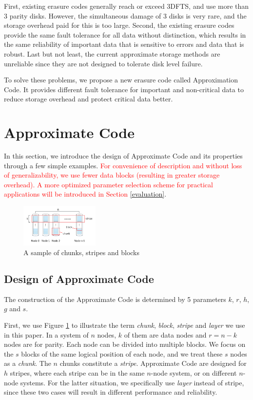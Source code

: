 \documentclass[sigconf]{acmart}
\begin{document}
First, existing erasure codes generally reach or exceed 3DFTS, and use more than 3 parity disks. However, the simultaneous damage of 3 disks is very rare, and the storage overhead paid for this is too large. Second, the existing erasure codes provide the same fault tolerance for all data without distinction, which results in the same reliability of important data that is sensitive to errors and data that is robust. Last but not least, the current approximate storage methods are unreliable since they are not designed to tolerate disk level failure.

To solve these problems, we propose a new erasure code called Approximation Code. It provides different fault tolerance for important and non-critical data to reduce storage overhead and protect critical data better.

\section{Approximate Code}\label{ApCode}
In this section, we introduce the design of Approximate Code and its properties through a few simple examples. 
\textcolor{red}{For convenience of description and without loss of generalizability, we use fewer data blocks (resulting in greater storage overhead). A more optimized parameter selection scheme for practical applications will be introduced in Section} \ref{evaluation}.
 

\begin{figure}[ht]
\centering
\includegraphics[width=0.35\textwidth]{photo/chunk-block.pdf}
\caption{A sample of chunks, stripes and blocks}
\label{fig-chunk-block}
\end{figure}


\subsection{Design of Approximate Code}
The construction of the Approximate Code is determined by 5 parameters $k$, $r$, $h$, $g$ and $s$. 

First, we use Figure \ref{fig-chunk-block} to illustrate the term \emph{chunk}, \emph{block}, \emph{stripe} and \emph{layer} we use in this paper. In a system of $n$ nodes, $k$ of them are data nodes and $r=n-k$ nodes are for parity. Each node can be divided into multiple blocks. We focus on the $s$ blocks of the same logical position of each node, and we treat these $s$ nodes as a \emph{chunk}. The $n$ chunks constitute a \emph{stripe}. Approximate Code are designed for $h$ stripes, where each stripe can be in the same $n$-node system, or on different $n$-node systems.
For the latter situation, we specifically use \emph{layer} instead of stripe, since these two cases will result in different performance and reliability.
\end{document}
